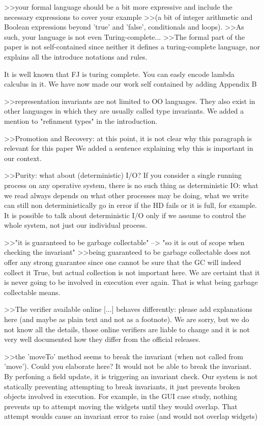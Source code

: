 >>your formal language should be a bit more expressive and include the necessary expressions to cover your example 
>>(a bit of integer arithmetic and Boolean expressions beyond 'true' and 'false', conditionals and loops).
>>As such, your language is not even Turing-complete...
>>The formal part of the paper is not self-contained since neither it defines a turing-complete language, nor explains all the introduce notations and rules.

It is well known that FJ is turing complete. You can easly encode lambda calculus in it.
We have now made our work self contained by adding Appendix B


>>representation invariants are not limited to OO languages. They also exist in other languages in which they are usually called type invariants.
We added a mention to "refinment types" in the introduction.


>>Promotion and Recovery: at this point, it is not clear why this paragraph is relevant for this paper
We added a sentence explaining why this is important in our context.

>>Purity: what about (deterministic) I/O?
If you consider a single running process on any operative system, there is no such thing as deterministic IO:
what we read always depends on what other processes may be doing,
what we write can still non deterministically go in error if the HD fails or it is full, for example.
It is possible to talk about deterministic I/O only if we assume to control the whole system, not just our individual process.

>>"it is guaranteed to be garbage collectable" --> "so it is out of scope when checking the invariant" 
>>being guaranteed to be garbage collectable does not offer any strong guarantee since one cannot be sure that the GC will indeed collect it
True, but actual collection is not important here. We are certaint that it is never going to be involved in execution ever again.
That is what being garbage collectable means.


>>The verifier available online [...] behaves differently: please add explanations here (and maybe as plain text and not as a footnote).
We are sorry, but we do not know all the details, those online verifiers are liable to change and it is
not very well documented how they differ from the official releases.

>>the 'moveTo' method seems to break the invariant (when not called from 'move'). Could you elaborate here?
It would not be able to break the invariant.
By perfoning a field update, it is triggering an invariant check.
Our system is not statically preventing attempting to break invariants, it just prevents broken objects involved in execution.
For example, in the GUI case study, nothing prevents up to attempt moving the widgets until they would overlap.
That attempt woulds cause an invariant error to raise (and would not overlap widgets)

